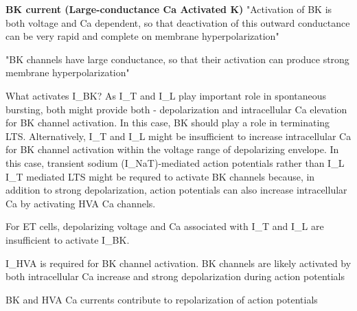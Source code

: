 \documentclass[11pt]{article}
\begin{document}




\textbf{BK current (Large-conductance Ca Activated K)}
"Activation of BK is both voltage and Ca dependent, so that deactivation of this outward
conductance can be very rapid and complete on membrane hyperpolarization" \cite{liuMultipleConductancesCooperatively2008}        

"BK channels have large conductance, so that their activation can produce strong membrane hyperpolarization" \cite{liuMultipleConductancesCooperatively2008}

What activates I\_BK? As I\_T and I\_L play important role in spontaneous bursting,
both might provide both - depolarization and intracellular Ca elevation for BK channel activation.
In this case, BK should play a role in terminating LTS. Alternatively, I\_T and I\_L might be insufficient
to increase intracellular Ca for BK channel activation within the voltage range of depolarizing envelope.
In this case, transient sodium (I\_NaT)-mediated action potentials rather than I\_L I\_T mediated LTS might
be requred to activate BK
channels because, in addition to strong depolarization, action potentials can also increase intracellular
Ca by activating HVA Ca channels. \cite{liuMultipleConductancesCooperatively2008}

For ET cells, depolarizing voltage and Ca associated with I\_T and I\_L are insufficient to
activate I\_BK. \cite{liuMultipleConductancesCooperatively2008}

I\_HVA is required for BK channel activation. BK channels are likely activated by both intracellular
Ca increase and strong depolarization during action potentials \cite{liuMultipleConductancesCooperatively2008}

BK and HVA Ca currents contribute to repolarization of action potentials \cite{liuMultipleConductancesCooperatively2008}
\end{document}
